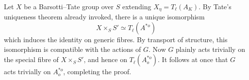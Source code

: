 Let $X$ be a Barsotti--Tate group over $S$ extending
$X_\eta=T_\ell(A_K)$. By Tate's uniqueness theorem already invoked,
there is a unique isomorphism
\[
 X\times_S S'\simeq T_\ell(A^{*o})
\]
which induces the identity on generic fibres. By transport of
structure, this isomorphism is compatible with the actions of $G$.
Now $G$ plainly acts trivially on the special fibre of
$X\times_S S'$, and hence on $T_\ell(A_o^{*o})$. It follows at once
that $G$ acts trivially on $A_o^{*o}$, completing the proof.
